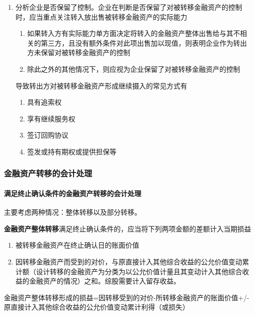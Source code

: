 \documentclass[UTF8,12pt]{ctexart}
\numberwithin{equation}{section} %
\numberwithin{figure}{section}
\numberwithin{table}{section}
\begin{document}
\begin{enumerate}
		\item 分析企业是否保留了控制。企业在判断是否保留了对被转移金融资产的控制时，应当重点关注转入放出售被转移金融资产的实际能力
		\begin{enumerate}
			\item 如果转入方有实际能力单方面决定将转入的金融资产整体出售给与其不相关的第三方，且没有额外条件对此项出售加以现值，则表明企业作为转出方未保留对被转移金融资产的控制
			
			\item 除此之外的其他情况下，则应视为企业保留了对被转移金融资产的控制
		\end{enumerate}
	
		导致转出方对被转移金融资产形成继续摄入的常见方式有
		\begin{enumerate}
			\item 具有追索权
			
			\item 享有继续服务权
			
			\item 签订回购协议
			
			\item 签发或持有期权或提供担保等
		\end{enumerate}
	\end{enumerate}
	
	\subsubsection{金融资产转移的会计处理}
	\paragraph{满足终止确认条件的金融资产转移的会计处理} 主要考虑两种情况：整体转移以及部分转移。
	
	\textbf{金融资产整体转移}满足终止确认条件的，应当将下列两项金额的差额计入当期损益
	\begin{enumerate}
		\item 被转移金融资产在终止确认日的账面价值
		
		\item 因转移金融资产而受到的对价，与原直接计入其他综合收益的公允价值变动累计额（设计转移的金融资产为分类为以公允价值计量且其变动计入其他综合收益的金融资产的情况）之和。综股需要计入留存收益。
	\end{enumerate}

	金融资产整体转移形成的损益=因转移受到的对价-所转移金融资产的账面价值+/-原直接计入其他综合收益的公允价值变动累计利得（或损失）
	
\end{document}
